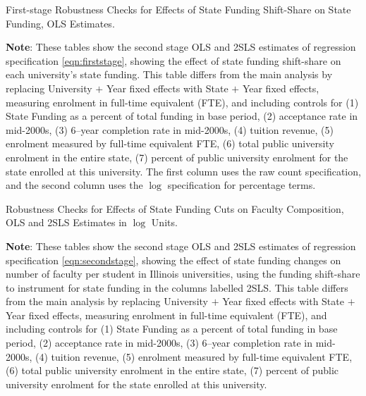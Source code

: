 \begin{table}[H]
    \singlespacing
    \centering
    \caption{First-stage Robustness Checks for Effects of State Funding Shift-Share on State Funding, OLS Estimates.}
    \makebox[\textwidth][c]{}
    \label{tab:firststage-robustness-checks}
    \justify
    \footnotesize
    \textbf{Note}:
    These tables show the second stage OLS and 2SLS estimates of regression specification \eqref{eqn:firststage}, showing the effect of state funding shift-share on each university's state funding.
    This table differs from the main analysis by replacing University $+$ Year fixed effects with State $+$ Year fixed effects, measuring enrolment in full-time equivalent (FTE), and including controls for (1)
    State Funding as a percent of total funding in base period, (2) acceptance rate in mid-2000s, (3) 6--year completion rate in mid-2000s, (4) tuition revenue, (5) enrolment measured by full-time equivalent FTE, (6) total public university enrolment in the entire state, (7) percent of public university enrolment for the state enrolled at this university.
    The first column uses the raw count specification, and the second column uses the $\log$ specification for percentage terms.
\end{table}

\begin{table}[H]
    \singlespacing
    \centering
    \caption{Robustness Checks for Effects of State Funding Cuts on Faculty Composition, OLS and 2SLS Estimates in $\log$ Units.}
    \makebox[\textwidth][c]{
        }
    \label{tab:facultycount-robustness-checks}
    \justify
    \footnotesize
    \textbf{Note}:
    These tables show the second stage OLS and 2SLS estimates of regression specification \eqref{eqn:secondstage}, showing the effect of state funding changes on number of faculty per student in Illinois universities, using the funding shift-share to instrument for state funding in the columns labelled 2SLS.
    This table differs from the main analysis by replacing University $+$ Year fixed effects with State $+$ Year fixed effects, measuring enrolment in full-time equivalent (FTE), and including controls for (1)
    State Funding as a percent of total funding in base period, (2) acceptance rate in mid-2000s, (3) 6--year completion rate in mid-2000s, (4) tuition revenue, (5) enrolment measured by full-time equivalent FTE, (6) total public university enrolment in the entire state, (7) percent of public university enrolment for the state enrolled at this university.
\end{table}



